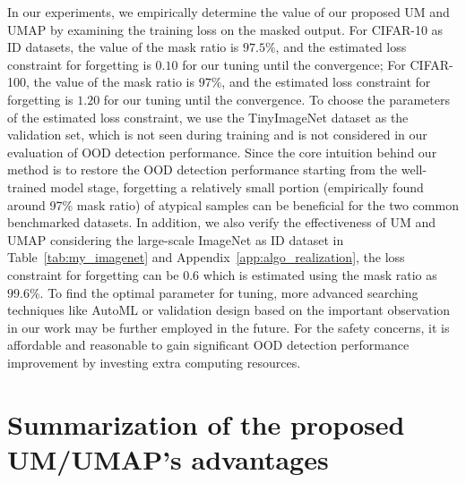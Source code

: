 \documentclass{article}
\theoremstyle{plain}
\theoremstyle{definition}
\theoremstyle{remark}
\begin{document}
In our experiments, we empirically determine the value of our proposed UM and UMAP by examining the training loss on the masked output. For CIFAR-10 as ID datasets, the value of the mask ratio is $97.5\%$, and the estimated loss constraint for forgetting is $0.10$ for our tuning until the convergence; For CIFAR-100, the value of the mask ratio is $97\%$, and the estimated loss constraint for forgetting is $1.20$ for our tuning until the convergence. To choose the parameters of the estimated loss constraint, we use the TinyImageNet \citep{DBLP:booktitles/corr/abs-2007-06712} dataset as the validation set, which is not seen during training and is not considered in our evaluation of OOD detection performance. Since the core intuition behind our method is to restore the OOD detection performance starting from the well-trained model stage, forgetting a relatively small portion (empirically found around 97\% mask ratio) of atypical samples can be beneficial for the two common benchmarked datasets. In addition, we also verify the effectiveness of UM and UMAP considering the large-scale ImageNet as ID dataset in Table~\ref{tab:my_imagenet} and Appendix~\ref{app:algo_realization}, the loss constraint for forgetting can be $0.6$ which is estimated using the mask ratio as $99.6\%$. To find the optimal parameter for tuning, more advanced searching techniques like AutoML or validation design based on the important observation in our work may be further employed in the future. For the safety concerns, it is affordable and reasonable to gain significant OOD detection performance improvement by investing extra computing resources.

\section{Summarization of the proposed UM/UMAP's advantages}
\end{document}
